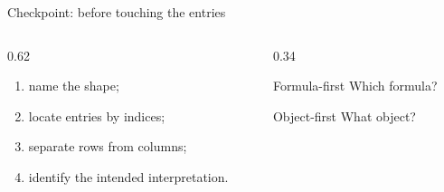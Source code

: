 \begin{frame}{Checkpoint: before touching the entries}
  \begin{columns}[T,onlytextwidth]
    \begin{column}{0.62\textwidth}
      \Large
      \begin{enumerate}
        \item name the shape;
        \item locate entries by indices;
        \item separate rows from columns;
        \item identify the intended interpretation.
      \end{enumerate}
    \end{column}
    \begin{column}{0.34\textwidth}
      \begin{alertblock}{Formula-first}
        Which formula?
      \end{alertblock}
      \begin{exampleblock}{Object-first}
        What object?
      \end{exampleblock}
    \end{column}
  \end{columns}
\end{frame}
